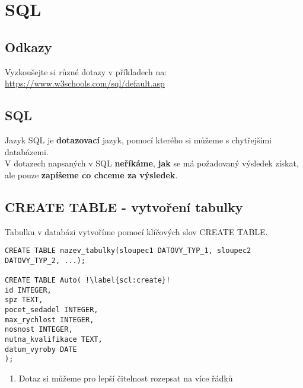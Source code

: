 \section{SQL}
\subsection{Odkazy}
Vyzkoušejte si různé dotazy v příkladech na:\\
\url{https://www.w3schools.com/sql/default.asp}
\subsection{SQL}
Jazyk SQL je \textbf{dotazovací} jazyk, pomocí kterého si můžeme  s chytřejšími databázemi.\\
V dotazech napsaných v SQL \textbf{neříkáme}, \textbf{jak} se má požadovaný výsledek získat, ale pouze \textbf{zapíšeme co chceme za výsledek}.
\subsection{CREATE TABLE - vytvoření tabulky}
Tabulku v databázi vytvoříme pomocí klíčových slov CREATE TABLE.\\
\begin{minipage}[t]{.45\textwidth}
\begin{code}
\begin{verbatim}
CREATE TABLE nazev_tabulky(sloupec1 DATOVY_TYP_1, sloupec2 DATOVY_TYP_2, ...);

CREATE TABLE Auto( !\label{scl:create}!
id INTEGER,
spz TEXT,
pocet_sedadel INTEGER,
max_rychlost INTEGER,
nosnost INTEGER,
nutna_kvalifikace TEXT,
datum_vyroby DATE
);
\end{verbatim}
\label{code:create_table}
\end{code}
\end{minipage}
\begin{minipage}[t]{.45\textwidth}
\vspace{1.7cm}
\begin{enumerate}
\item[ř. \ref{scl:create}:]	Dotaz si můžeme pro lepší čitelnost rozepsat na více řádků
\end{enumerate} 
\end{minipage}

